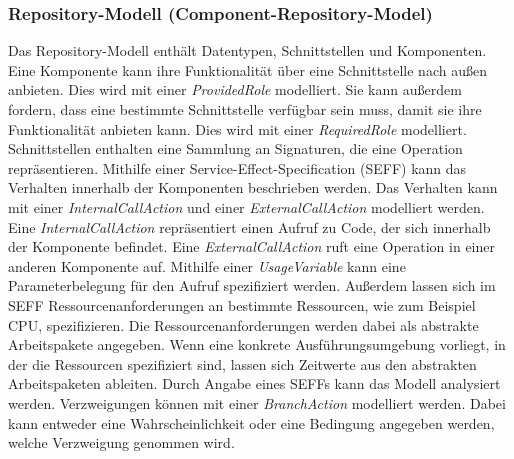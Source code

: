 \subsubsection{Repository-Modell (Component-Repository-Model)} 
Das Repository-Modell enthält Datentypen, Schnittstellen und Komponenten. Eine Komponente kann ihre Funktionalität über eine Schnittstelle nach außen anbieten. Dies wird mit einer \emph{ProvidedRole} modelliert. Sie kann außerdem fordern, dass eine bestimmte Schnittstelle verfügbar sein muss, damit sie ihre Funktionalität anbieten kann. Dies wird mit einer \emph{RequiredRole} modelliert. Schnittstellen enthalten eine Sammlung an Signaturen, die eine Operation repräsentieren. 
Mithilfe einer Service-Effect-Specification (SEFF) kann das Verhalten innerhalb der Komponenten beschrieben werden. Das Verhalten kann mit einer \emph{InternalCallAction} und einer \emph{ExternalCallAction} modelliert werden. Eine \emph{InternalCallAction} repräsentiert einen Aufruf zu Code, der sich innerhalb der Komponente befindet. Eine \emph{ExternalCallAction} ruft eine Operation in einer anderen Komponente auf. Mithilfe einer \emph{UsageVariable} kann eine Parameterbelegung für den Aufruf spezifiziert werden. Außerdem lassen sich im SEFF Ressourcenanforderungen an bestimmte Ressourcen, wie zum Beispiel CPU,  spezifizieren. Die Ressourcenanforderungen werden dabei als abstrakte Arbeitspakete angegeben. Wenn eine konkrete Ausführungsumgebung vorliegt, in der die Ressourcen spezifiziert sind, lassen sich Zeitwerte aus den abstrakten Arbeitspaketen ableiten. Durch Angabe eines SEFFs kann das Modell analysiert werden.
Verzweigungen können mit einer \emph{BranchAction} modelliert werden. Dabei kann entweder eine Wahrscheinlichkeit oder eine Bedingung angegeben werden, welche Verzweigung genommen wird. 
